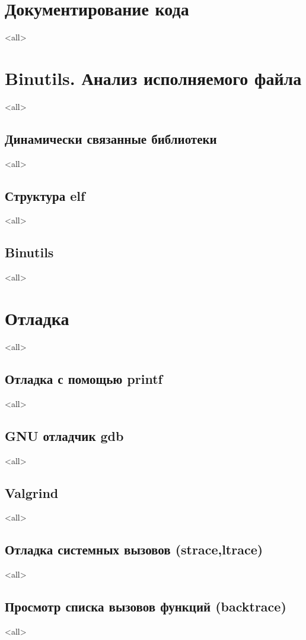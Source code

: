 \chapter{Документирование кода}
\mode<all>{}

\chapter{Binutils. Анализ исполняемого файла}
\mode<all>{}
\section{Динамически связанные библиотеки}
\mode<all>{}
\section{Структура elf}
\mode<all>{}
\section{Binutils}
\mode<all>{}

\chapter{Отладка}
\mode<all>{}
\section{Отладка с помощью printf}
\mode<all>{}
\section{GNU отладчик gdb}
\mode<all>{}
\section{Valgrind}
\mode<all>{}
\section{Отладка системных вызовов (strace,ltrace)}
\mode<all>{}
\section{Просмотр списка вызовов функций (backtrace)}
\mode<all>{}

